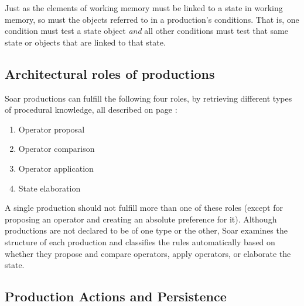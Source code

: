 Just as the elements of working memory must be linked to a state 
in working memory, so must the objects referred to in a production's
conditions. That is, one condition must test a state object 
\emph{and} all other conditions must test that same state or objects that
are linked to that state.

\subsection{Architectural roles of productions}
\label{ARCH-pm-roles}

Soar productions can fulfill the following four roles, by retrieving
different types of procedural knowledge, all described on page \pageref{LIST:4KnowledgeTypes}:\vspace{-10pt}
\begin{enumerate}
\item Operator proposal\vspace{-10pt}
\item Operator comparison\vspace{-10pt}
\item Operator application\vspace{-10pt}
\item State elaboration
\end{enumerate}

A single production should not fulfill more than one of these roles
(except for proposing an operator and creating an absolute preference
for it). Although productions are not declared to be of one type or the
other, Soar examines the structure of each production and classifies the
rules automatically based on whether they propose and compare operators,
apply operators, or elaborate the state. 

\subsection{Production Actions and Persistence}
\label{ARCH-prefmem-persistence}
\label{PAGE:O-support}

